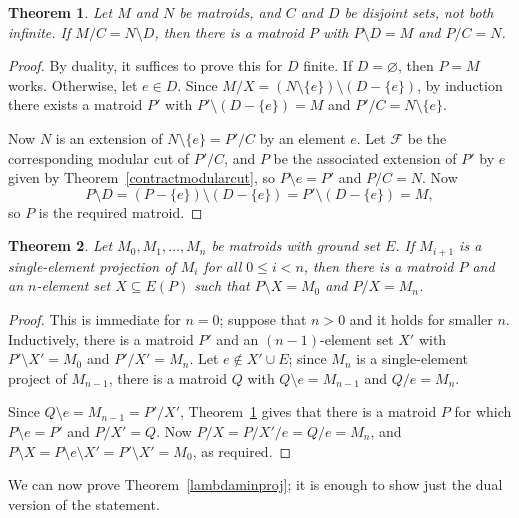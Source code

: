 \documentclass{amsart}
\theoremstyle{plain}
\newtheorem{theorem}{Theorem}[section]
\theoremstyle{definition}
\newcommand{\cF}{\mathcal{F}}
\newcommand{\del}{\!\setminus\!}
\newcommand{\con}{/}
\newcommand{\es}{\varnothing}
\renewcommand{\le}{\leqslant}
\renewcommand{\ss}{\subseteq}
\begin{document}
\begin{theorem}\label{majorofminor}
  Let $M$ and $N$ be matroids, and $C$ and $D$ be disjoint sets, not both infinite. If $M \con C = N \del D$,
  then there is a matroid $P$ with $P \del D = M$ and $P \con C = N$. 
\end{theorem}
\begin{proof}
  By duality, it suffices to prove this for $D$ finite. If $D = \es$, then $P = M$ works. 
  Otherwise, let $e \in D$. Since $M \con X = (N \del \{e\}) \del (D - \{e\})$, 
  by induction there exists a matroid $P'$ with $P' \del (D - \{e\}) = M$ and $P' \con C = N \del \{e\}$. 
  
  Now $N$ is an extension of $N \del \{e\} = P' \con C$ by an element $e$.
  Let $\cF$ be the corresponding modular cut of $P' \con C$, and 
  $P$ be the associated extension of $P'$ by $e$ given by Theorem~\ref{contractmodularcut}, 
  so $P \del e = P'$ and $P \con C = N$. 
  Now 
  \[P \del D = (P - \{e\}) \del (D - \{e\}) = P' \del (D - \{e\}) = M,\] 
  so $P$ is the required matroid. 
\end{proof}

\begin{theorem}\label{projectseq}
  Let $M_0, M_1, \dotsc, M_n$ be matroids with ground set $E$. 
  If $M_{i+1}$ is a single-element projection of $M_i$ for all $0 \le i < n$, 
  then there is a matroid $P$ and an $n$-element set $X \ss E(P)$ such that $P \del X = M_0$ and $P \con X = M_n$. 
\end{theorem}
\begin{proof}
  This is immediate for $n = 0$; suppose that $n > 0$ and it holds for smaller $n$. 
  Inductively, there is a matroid $P'$ and an $(n-1)$-element set $X'$ with $P' \del X' = M_0$ and $P' \con X' = M_n$. 
  Let $e \notin X' \cup E$; since $M_n$ is a single-element project of $M_{n-1}$, there is
  a matroid $Q$ with $Q \del e = M_{n-1}$ and $Q \con e = M_n$. 

  Since $Q \del e = M_{n-1} = P' \con X'$, Theorem~\ref{majorofminor} gives that there is a matroid $P$ 
  for which $P \del e = P'$ and $P \con X' = Q$. Now $P \con X = P \con X' \con e = Q \con e = M_n$, 
  and $P \del X = P \del e \del X' = P' \del X' = M_0$, as required. 
\end{proof} 

We can now prove Theorem~\ref{lambdaminproj}; it is enough to show just the dual version
of the statement. 
\end{document}
